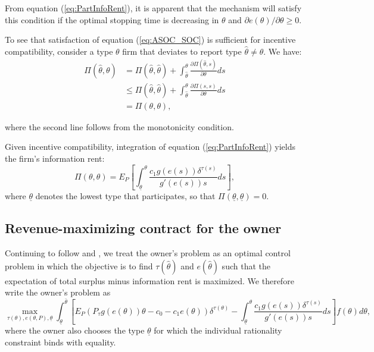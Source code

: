 \documentclass[12pt]{article}
\begin{document}
From equation (\ref{eq:PartInfoRent}), it is apparent that the mechanism will satisfy this condition if the optimal stopping time is decreasing in $\theta$ and $\partial e(\theta)/\partial\theta\geq0$.

To see that satisfaction of equation (\ref{eq:ASOC_SOC}) is sufficient for incentive compatibility, consider a type $\theta$ firm that deviates to report type $\hat{\theta}\neq\theta$. We have:
\begin{align}
\Pi(\hat{\theta},\theta) &= \Pi(\hat{\theta},\hat{\theta})+\int_{\hat{\theta}}^\theta \frac{\partial\Pi(\hat{\theta},s)}{\partial\theta}ds \nonumber \\
&\leq \Pi(\hat{\theta},\hat{\theta})+\int_{\hat{\theta}}^\theta \frac{\partial\Pi(s,s)}{\partial\theta}ds \nonumber \\
&= \Pi(\theta,\theta),
\end{align}

where the second line follows from the monotonicity condition.

Given incentive compatibility, integration of equation (\ref{eq:PartInfoRent}) yields the firm's information rent:
\begin{equation}
\Pi(\theta,\theta) = E_P\left[\int_{\underline{\theta}}^\theta \frac{c_1g(e(s))\delta^{\tau(s)}}{g'(e(s))s}ds\right], \label{eq:InfoRent}
\end{equation}
where $\underline{\theta}$ denotes the lowest type that participates, so that $\Pi(\underline{\theta},\underline{\theta})=0$.


\subsection{Revenue-maximizing contract for the owner \label{appx:Opt}}

Continuing to follow \citet{bib:laffonttirole1986} and \citet{bib:board}, we treat the owner's problem as an optimal control problem in which the objective is to find $\tau(\hat{\theta})$ and $e(\hat{\theta})$ such that the expectation of total surplus minus information rent is maximized. We therefore write the owner's problem as
\begin{equation}
\max_{\tau(\theta),e(\theta,P),\underline{\theta}} \int_{\underline{\theta}}^{\bar\theta} \left[E_P\left(P_\tau g(e(\theta))\theta - c_0 - c_1e(\theta)\right)\delta^{\tau(\theta)} - \int_{\underline{\theta}}^\theta \frac{c_1g(e(s))\delta^{\tau(s)}}{g'(e(s))s}ds\right]f(\theta)d\theta, \label{eq:PrincipalProb}
\end{equation}
where the owner also chooses the type $\underline{\theta}$ for which the individual rationality constraint binds with equality.
\end{document}
